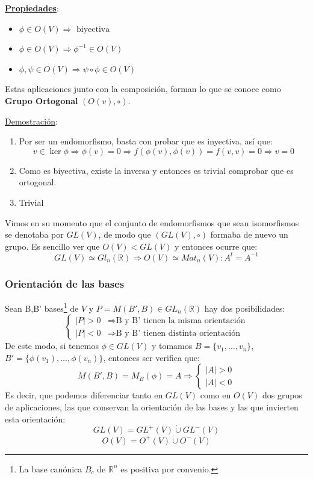 \documentclass[10pt,a4paper,openright]{book}
\begin{document}
\underline{\textbf{Propiedades}}:
\begin{itemize}
\item $\phi \in O(V)\Rightarrow \mbox{ biyectiva}$
\item $\phi\in O(V)\Rightarrow \phi^{-1}\in O(V)$
\item $\phi,\psi \in O(V)\Rightarrow \psi \circ \phi \in O(V)$
\end{itemize}
Estas aplicaciones junto con la composición, forman lo que se conoce como \textbf{Grupo Ortogonal} $\left(O(v),\circ \right)$.

\underline{Demostración}:
\begin{enumerate}
\item Por ser un endomorfismo, basta con probar que es inyectiva, así que:
$$v\in \ker \phi \Rightarrow \phi(v) = 0 \Rightarrow f(\phi (v), \phi (v)) = f(v,v) = 0 \Rightarrow v= 0$$
\item Como es biyectiva, existe la inversa y entonces es trivial comprobar que es ortogonal.
\item Trivial
\end{enumerate}

Vimos en su momento que el conjunto de endomorfismos que sean isomorfismos se denotaba por $GL(V)$, de modo que $(GL(V),\circ)$ formaba de nuevo un grupo. Es sencillo ver que $O(V)<GL(V)$ y entonces ocurre que:
$$GL(V)\simeq Gl_n(\mathbb R)\Rightarrow O(V)\simeq Mat_n(V): A^t = A^{-1}$$

\subsubsection*{Orientación de las bases}
Sean B,B' bases\footnote{La base canónica $B_c$ de $\mathbb{R}^n$ es positiva por convenio.} de $V$ y $P=M(B',B) \in GL_n(\mathbb{R})$ hay dos posibilidades:
$$\begin{cases} |P|>0 & \Rightarrow \mbox{B y B' tienen la misma orientación} \\ |P|<0 & \Rightarrow \mbox{B y B' tienen distinta orientación} \end{cases}$$
De este modo, si tenemos $\phi \in GL(V)$ y tomamos $B=\{ v_1, \ldots, v_n\}$, $B'=\{ \phi(v_1), \ldots, \phi(v_n)\}$, entonces ser verifica que:
$$M(B', B) = M_B (\phi) = A\Rightarrow \begin{cases} |A| > 0 \\ |A| < 0 \end{cases}$$
Es decir, que podemos diferenciar tanto en $GL(V)$ como en $O(V)$ dos grupos de aplicaciones, las que conservan la orientación de las bases y las que invierten esta orientación:
$$GL(V) = GL^+ (V) \dot{\cup} GL^- (V)$$
$$O(V) = O^+ (V) \dot{\cup} O^- (V)$$
\end{document}
